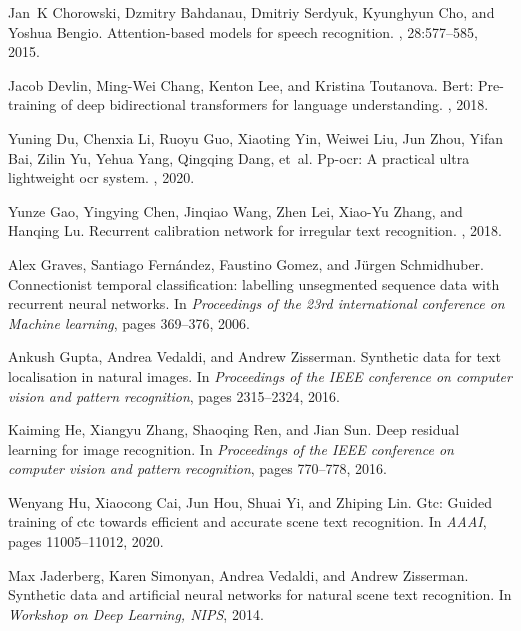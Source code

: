 \documentclass[final]{cvpr}
\begin{document}
{\begin{thebibliography}{10}
Jan~K Chorowski, Dzmitry Bahdanau, Dmitriy Serdyuk, Kyunghyun Cho, and Yoshua
  Bengio.
\newblock Attention-based models for speech recognition.
, 28:577--585,
  2015.

Jacob Devlin, Ming-Wei Chang, Kenton Lee, and Kristina Toutanova.
\newblock Bert: Pre-training of deep bidirectional transformers for language
  understanding.
, 2018.

Yuning Du, Chenxia Li, Ruoyu Guo, Xiaoting Yin, Weiwei Liu, Jun Zhou, Yifan
  Bai, Zilin Yu, Yehua Yang, Qingqing Dang, et~al.
\newblock Pp-ocr: A practical ultra lightweight ocr system.
, 2020.

Yunze Gao, Yingying Chen, Jinqiao Wang, Zhen Lei, Xiao-Yu Zhang, and Hanqing
  Lu.
\newblock Recurrent calibration network for irregular text recognition.
, 2018.

Alex Graves, Santiago Fern{\'a}ndez, Faustino Gomez, and J{\"u}rgen
  Schmidhuber.
\newblock Connectionist temporal classification: labelling unsegmented sequence
  data with recurrent neural networks.
\newblock In {\em Proceedings of the 23rd international conference on Machine
  learning}, pages 369--376, 2006.

Ankush Gupta, Andrea Vedaldi, and Andrew Zisserman.
\newblock Synthetic data for text localisation in natural images.
\newblock In {\em Proceedings of the IEEE conference on computer vision and
  pattern recognition}, pages 2315--2324, 2016.

Kaiming He, Xiangyu Zhang, Shaoqing Ren, and Jian Sun.
\newblock Deep residual learning for image recognition.
\newblock In {\em Proceedings of the IEEE conference on computer vision and
  pattern recognition}, pages 770--778, 2016.

Wenyang Hu, Xiaocong Cai, Jun Hou, Shuai Yi, and Zhiping Lin.
\newblock Gtc: Guided training of ctc towards efficient and accurate scene text
  recognition.
\newblock In {\em AAAI}, pages 11005--11012, 2020.

Max Jaderberg, Karen Simonyan, Andrea Vedaldi, and Andrew Zisserman.
\newblock Synthetic data and artificial neural networks for natural scene text
  recognition.
\newblock In {\em Workshop on Deep Learning, NIPS}, 2014.


\end{thebibliography}}
\end{document}
